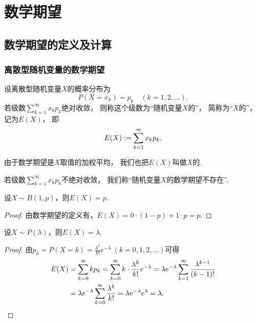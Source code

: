 \section{数学期望}
\subsection{数学期望的定义及计算}
\subsubsection{离散型随机变量的数学期望}
\begin{definition}
设离散型随机变量\(X\)的概率分布为\[
	P(X=x_k) = p_k
	\quad(k=1,2,\dotsc).
\]
若级数\(\sum_{k=1}^\infty x_k p_k\)绝对收敛，
则称这个级数为“随机变量\(X\)的”，
简称为“\(X\)的”，
记为\(E(X)\)，
即\begin{equation}\label{equation:随机变量的数字特征.离散型数学期望的定义式}
	E(X) := \sum_{k=1}^\infty x_k p_k.
\end{equation}

由于数学期望是\(X\)取值的加权平均，
我们也把\(E(X)\)叫做\(X\)的.

若级数\(\sum_{k=1}^\infty x_k p_k\)不绝对收敛，
我们称“随机变量\(X\)的数学期望不存在”.
\end{definition}

\begin{proposition}\label{theorem:随机变量的数字特征.0-1分布的数学期望}
设\(X \sim B(1,p)\)，则\(E(X) = p\).
\begin{proof}
由数学期望的定义有，\(E(X) = 0 \cdot (1-p) + 1 \cdot p = p\).
\end{proof}
\end{proposition}

\begin{proposition}\label{theorem:随机变量的数字特征.泊松分布的数学期望}
设\(X \sim P(\lambda)\)，则\(E(X) = \lambda\).
\begin{proof}
由\(p_k = P(X=k) = \frac{\lambda^k}{k!} e^{-\lambda}\ (k=0,1,2,\dotsc)\)可得
\begin{align*}
	E(X) &= \sum_{k=0}^\infty k p_k
	= \sum_{k=0}^\infty k \cdot \frac{\lambda^k}{k!} e^{-\lambda}
	= \lambda e^{-\lambda} \sum_{k=1}^\infty \frac{\lambda^{k-1}}{(k-1)!} \\
	&= \lambda e^{-\lambda} \sum_{k=0}^\infty \frac{\lambda^k}{k!}
	= \lambda e^{-\lambda} e^\lambda
	= \lambda.
	\qedhere
\end{align*}
\end{proof}
\end{proposition}

